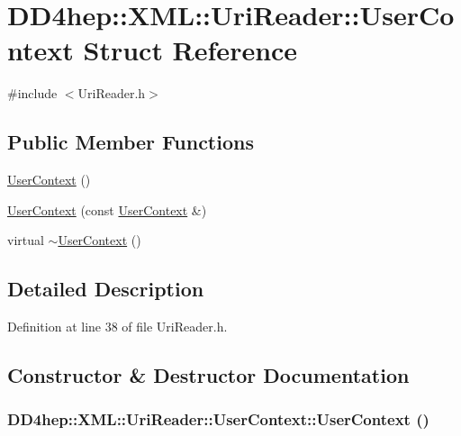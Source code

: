 \hypertarget{struct_d_d4hep_1_1_x_m_l_1_1_uri_reader_1_1_user_context}{
\section{DD4hep::XML::UriReader::UserContext Struct Reference}
\label{struct_d_d4hep_1_1_x_m_l_1_1_uri_reader_1_1_user_context}
}


{\ttfamily \#include $<$UriReader.h$>$}\subsection*{Public Member Functions}
\begin{DoxyCompactItemize}
\item 
\hyperlink{struct_d_d4hep_1_1_x_m_l_1_1_uri_reader_1_1_user_context_a1bb2229dead738dc31cb6cccccbeaa4d}{UserContext} ()
\item 
\hyperlink{struct_d_d4hep_1_1_x_m_l_1_1_uri_reader_1_1_user_context_a3597e8269b9454ec60a49b9611a5b002}{UserContext} (const \hyperlink{struct_d_d4hep_1_1_x_m_l_1_1_uri_reader_1_1_user_context}{UserContext} \&)
\item 
virtual \hyperlink{struct_d_d4hep_1_1_x_m_l_1_1_uri_reader_1_1_user_context_afabe7889ca4e26019a3108850361287e}{$\sim$UserContext} ()
\end{DoxyCompactItemize}


\subsection{Detailed Description}


Definition at line 38 of file UriReader.h.

\subsection{Constructor \& Destructor Documentation}
\hypertarget{struct_d_d4hep_1_1_x_m_l_1_1_uri_reader_1_1_user_context_a1bb2229dead738dc31cb6cccccbeaa4d}{
\subsubsection[{UserContext}]{\setlength{\rightskip}{0pt plus 5cm}DD4hep::XML::UriReader::UserContext::UserContext ()}}
\label{struct_d_d4hep_1_1_x_m_l_1_1_uri_reader_1_1_user_context_a1bb2229dead738dc31cb6cccccbeaa4d}


